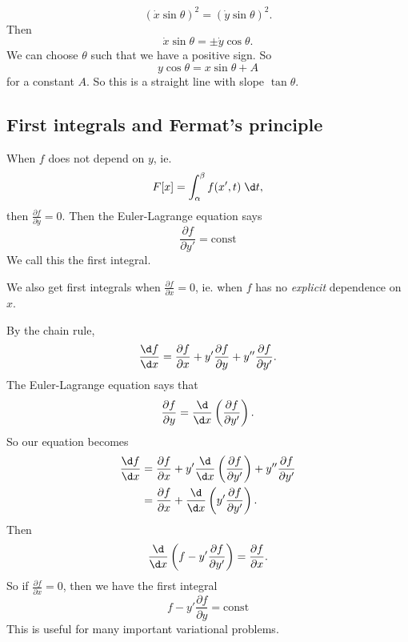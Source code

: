 \documentclass[a4paper]{article}
\begin{document}
\begin{eg}
\begin{enumerate}
      \[
        (\dot x \sin \theta)^2 = (\dot y\sin \theta)^2.
      \]
      Then
      \[
        \dot x \sin \theta = \pm\dot y \cos \theta.
      \]
      We can choose $\theta$ such that we have a positive sign. So
      \[
        y\cos \theta = x\sin \theta + A
      \]
      for a constant $A$. So this is a straight line with slope $\tan \theta$.
  \end{enumerate}
\end{eg}
\subsection{First integrals and Fermat's principle}
When $f$ does not depend on $y$, ie.
\[
  F[x] = \int_\alpha^\beta f(x', t)\;\d t,
\]
then $\frac{\partial f}{\partial y} = 0$. Then the Euler-Lagrange equation says
\[
  \frac{\partial f}{\partial y'} = \text{const}
\]
We call this the first integral.

We also get first integrals when $\frac{\partial f}{\partial x} = 0$, ie. when $f$ has no \emph{explicit} dependence on $x$.

By the chain rule,
\[
  \frac{\d f}{\d x} = \frac{\partial f}{\partial x} + y' \frac{\partial f}{\partial y} + y'' \frac{\partial f}{\partial y'}.
\]
The Euler-Lagrange equation says that
\[
  \frac{\partial f}{\partial y} = \frac{\d}{\d x} \left(\frac{\partial f}{\partial y'}\right).
\]
So our equation becomes
\begin{align*}
  \frac{\d f}{\d x} &= \frac{\partial f}{\partial x} + y' \frac{\d}{\d x}\left(\frac{\partial f}{\partial y'}\right) + y''\frac{\partial f}{\partial y'}\\
  &= \frac{\partial f}{\partial x} + \frac{\d}{\d x}\left(y'\frac{\partial f}{\partial y'}\right).
\end{align*}
Then
\[
  \frac{\d}{\d x}\left(f - y'\frac{\partial f}{\partial y'}\right) = \frac{\partial f}{\partial x}.
\]
So if $\frac{\partial f}{\partial x} = 0$, then we have the first integral
\[
  f - y'\frac{\partial f}{\partial y} = \text{const}
\]
This is useful for many important variational problems.
\end{document}
